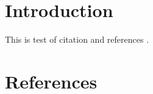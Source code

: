 \documentclass[a4paper, 12pt]{article}
\begin{document}
\section{Introduction}
This is test of citation and references \cite{test}.

\section{References}
\begin{refsection}
\nocite{*}
\printbibliography[heading=none]
\end{refsection}
\end{document}
